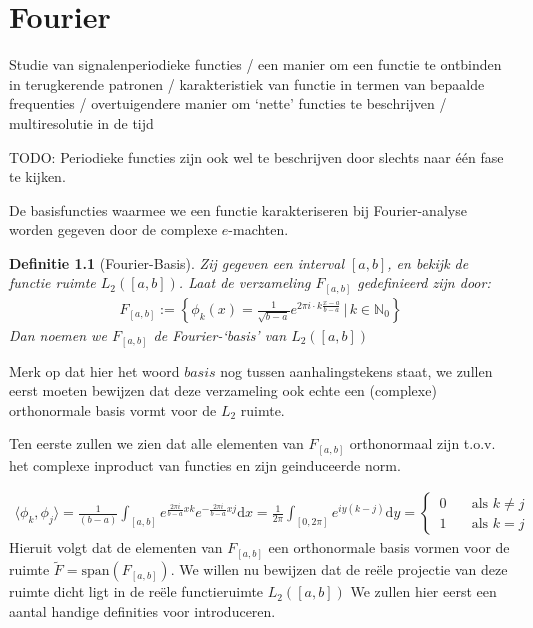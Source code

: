 \documentclass[11pt]{report}
\newcommand{\N}{\mathbb{N}}
\newtheorem*{definitie}{Definitie}
\theoremstyle{remark}
\newcommand{\eq}[1]{\begin{eqnarray*} #1 \end{eqnarray*}}
\newcommand{\dx}{\text{d}x}
\newcommand{\dy}{\text{d}y}
\newcommand{\largediv}{\,\big|\,}
\newcommand{\inpr}[2]{\langle #1 , #2 \rangle}
\begin{document}
\tableofcontents 
\newpage
\chapter{Fourier}

Studie van signalenperiodieke functies / 
een manier om een functie te ontbinden in terugkerende patronen /
karakteristiek van functie in termen van bepaalde frequenties /
overtuigendere manier om `nette' functies te beschrijven /
multiresolutie in de tijd

TODO: Periodieke functies zijn ook wel te beschrijven door slechts naar \'e\'en fase te kijken.

De basisfuncties waarmee we een functie karakteriseren bij Fourier-analyse worden gegeven door de complexe
$e$-machten.
\begin{definitie}[Fourier-Basis] Zij gegeven een interval $[a,b]$, en bekijk de functie ruimte $L_2([a,b])$. Laat de verzameling $F_{[a,b]}$ gedefinieerd zijn door:
\eq{
  F_{[a,b]} := \left\{ \phi_k(x) = \tfrac{1}{\sqrt{b-a}} e^{2 \pi i \cdot k \frac{x-a}{b-a}} \largediv k \in \N_0 \right\}
}
Dan noemen we $F_{[a,b]}$ de Fourier-`basis' van $L_2([a,b])$
\end{definitie}
Merk op dat hier het woord $basis$ nog tussen aanhalingstekens staat, we zullen eerst moeten bewijzen dat deze
verzameling ook echte een (complexe) orthonormale basis vormt voor de $L_2$ ruimte.

Ten eerste zullen we zien dat alle elementen van $F_{[a,b]}$ orthonormaal zijn t.o.v. het complexe inproduct van functies en zijn geinduceerde norm.

\eq{
  \inpr{\phi_k}{\phi_j} = \frac{1}{(b-a)}\int_{[a,b]} e^{\frac{2\pi i}{b-a} x k} 
                                                             e^{-\frac{2\pi i }{b-a} x j} \dx
                        = \frac{1}{2\pi}\int_{[0,2\pi]} e^{iy(k-j)} \dy =
                          \begin{cases}
                            \,0&\quad \text{als } k\neq j \\
                            \,1&\quad \text{als } k=j
                          \end{cases}
}
Hieruit volgt dat de elementen van $F_{[a,b]}$ een orthonormale basis vormen voor de ruimte $\tilde F = \text{span}(F_{[a,b]})$.
We willen nu bewijzen dat de re\"ele projectie van deze ruimte dicht ligt in de re\"ele functieruimte $L_2([a,b])$
We zullen hier eerst een aantal handige definities voor introduceren.
\end{document}

